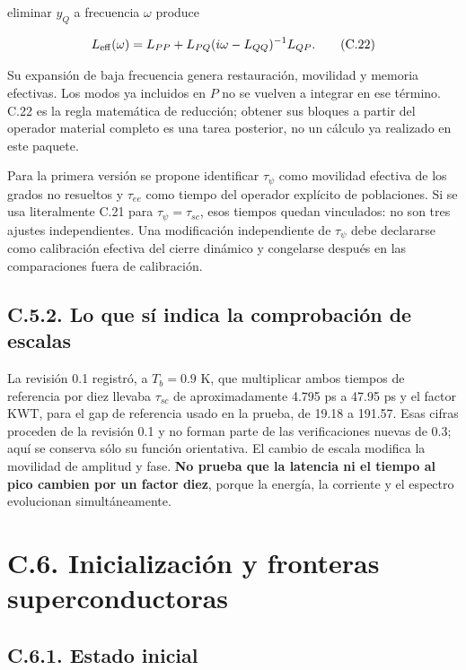 \documentclass[
  spanish,
  10pt,
  a4paper,
]{article}
\begin{document}
eliminar \(y_Q\) a frecuencia \(\omega\) produce

\[
L_{\rm eff}(\omega)=L_{PP}
+L_{PQ}(i\omega-L_{QQ})^{-1}L_{QP}. \tag{C.22}
\]

Su expansión de baja frecuencia genera restauración, movilidad y memoria
efectivas. Los modos ya incluidos en \(P\) no se vuelven a integrar en
ese término. C.22 es la regla matemática de reducción; obtener sus
bloques a partir del operador material completo es una tarea posterior,
no un cálculo ya realizado en este paquete.

Para la primera versión se propone identificar \(\tau_\psi\) como
movilidad efectiva de los grados no resueltos y \(\tau_{ee}\) como
tiempo del operador explícito de poblaciones. Si se usa literalmente
C.21 para \(\tau_\psi=\tau_{sc}\), esos tiempos quedan vinculados: no
son tres ajustes independientes. Una modificación independiente de
\(\tau_\psi\) debe declararse como calibración efectiva del cierre
dinámico y congelarse después en las comparaciones fuera de calibración.

\subsection{C.5.2. Lo que sí indica la comprobación de
escalas}\label{c.5.2.-lo-que-suxed-indica-la-comprobaciuxf3n-de-escalas}

La revisión 0.1 registró, a \(T_b=0.9\) K, que multiplicar ambos tiempos
de referencia por diez llevaba \(\tau_{sc}\) de aproximadamente 4.795 ps
a 47.95 ps y el factor KWT, para el gap de referencia usado en la
prueba, de 19.18 a 191.57. Esas cifras proceden de la revisión 0.1 y no
forman parte de las verificaciones nuevas de 0.3; aquí se conserva sólo
su función orientativa. El cambio de escala modifica la movilidad de
amplitud y fase. \textbf{No prueba que la latencia ni el tiempo al pico
cambien por un factor diez}, porque la energía, la corriente y el
espectro evolucionan simultáneamente.

\newpage

\section{C.6. Inicialización y fronteras
superconductoras}\label{c.6.-inicializaciuxf3n-y-fronteras-superconductoras}

\subsection{C.6.1. Estado inicial}\label{c.6.1.-estado-inicial}
\end{document}
